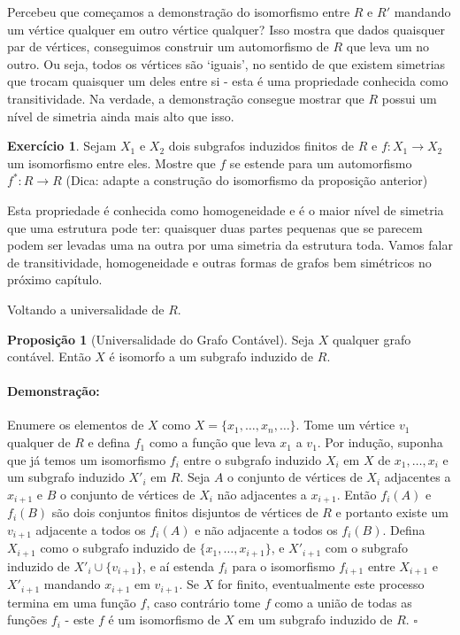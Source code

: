 \documentclass[11pt]{article}
\newcommand{\pulinho}{\vspace{.5cm}}
\newcommand{\luafacil}{
\emoji{waxing-crescent-moon}
}
\theoremstyle{definition}
\theoremstyle{definition}
\theoremstyle{definition}
\newtheorem{prop}{Proposição}
\newenvironment{proposicao}{
\definecolor{shadecolor}{HTML}{FFDBDF}
\begin{shaded}
\begin{prop}
}
{
\end{prop}
\end{shaded}
}
\theoremstyle{definition}
\theoremstyle{definition}
\theoremstyle{definition}
\theoremstyle{definition}
\theoremstyle{definition}
\theoremstyle{definition}
\theoremstyle{definition}
\theoremstyle{definition}
\theoremstyle{definition}
\newenvironment{prova}{\paragraph{Demonstração:}}{\hfill$\square$ 
\pulinho
}
\theoremstyle{definition}
\newtheorem{exersisio}{Exercício}
\newenvironment{exercicio}{
\definecolor{shadecolor}{HTML}{CFB5FF}
\begin{shaded}
\begin{exersisio}
}
{
\end{exersisio}
\end{shaded}
}
\begin{document}
Percebeu que começamos a demonstração do isomorfismo entre $R$ e $R'$ mandando um vértice qualquer em outro vértice qualquer? Isso mostra que dados quaisquer par de vértices, conseguimos construir um automorfismo de $R$ que leva um no outro. Ou seja, todos os vértices são `iguais', no sentido de que existem simetrias que trocam quaisquer um deles entre si - esta é uma propriedade conhecida como transitividade. Na verdade, a demonstração consegue mostrar que $R$ possui um nível de simetria ainda mais alto que isso.

\begin{exercicio}
    \luafacil Sejam $X_1$ e $X_2$ dois subgrafos induzidos finitos de $R$ e $f:X_1 \rightarrow X_2$ um isomorfismo entre eles. Mostre que $f$ se estende para um automorfismo $f^*: R \rightarrow R$ (Dica: adapte a construção do isomorfismo da proposição anterior)
\end{exercicio}

Esta propriedade é conhecida como homogeneidade e é o maior nível de simetria que uma estrutura pode ter: quaisquer duas partes pequenas que se parecem podem ser levadas uma na outra por uma simetria da estrutura toda. Vamos falar de transitividade, homogeneidade e outras formas de grafos bem simétricos no próximo capítulo.

Voltando a universalidade de $R$.

\begin{proposicao}[Universalidade do Grafo Contável]
    Seja $X$ qualquer grafo contável. Então $X$ é isomorfo a um subgrafo induzido de $R$.
\end{proposicao}
\begin{prova}
Enumere os elementos de $X$ como $X = \{x_1, \dots, x_n, \dots\} $. Tome um vértice $v_1$ qualquer de $R$ e defina $f_1$ como a função que leva $x_1$ a $v_1$. Por indução, suponha que já temos um isomorfismo $f_i$ entre o subgrafo induzido $X_i$ em $X$ de $x_1, \dots, x_i$ e um subgrafo induzido $X'_i$ em $R$. Seja $A$ o conjunto de vértices de $X_i$ adjacentes a $x_{i+1}$ e $B$ o conjunto de vértices de $X_i$ não adjacentes a $x_{i+1}$. Então $f_i(A)$ e $f_i(B)$ são dois conjuntos finitos disjuntos de vértices de $R$ e portanto existe um $v_{i+1}$ adjacente a todos os $f_i(A)$ e não adjacente a todos os $f_i(B)$. Defina $X_{i+1}$ como o subgrafo induzido de $\{x_1, \dots, x_{i+1}\}$, e $X'_{i+1}$ com o subgrafo induzido de $X'_i \cup \{v_{i+1}\}$, e aí estenda $f_i$ para o isomorfismo $f_{i+1}$ entre $X_{i+1}$ e $X'_{i+1}$ mandando $x_{i+1}$ em $v_{i+1}$. Se $X$ for finito, eventualmente este processo termina em uma função $f$, caso contrário tome $f$ como a união de todas as funções $f_i$ - este $f$ é um isomorfismo de $X$ em um subgrafo induzido de $R$.
\end{prova}
\end{document}

